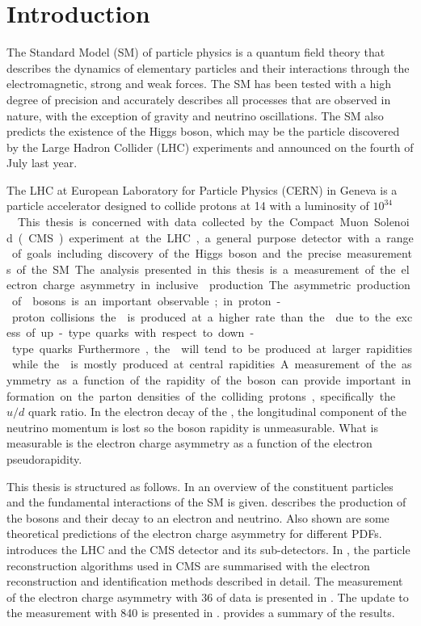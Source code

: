 \chapter{Introduction}
\label{chap:introduction}

The Standard Model (SM) of particle physics is a quantum field theory that
describes the dynamics of elementary particles and their interactions through
the electromagnetic, strong and weak forces. The {SM} has been tested with a
high degree of precision and accurately describes all processes that are observed
in nature, with the exception of gravity and neutrino oscillations. The {SM}
also predicts the existence of the Higgs boson, which may be the particle
discovered by the Large Hadron Collider (LHC) experiments and announced on the
fourth of July last year\cite{chatrchyan2012observation,aad2012observation}.

The LHC at European Laboratory for Particle Physics
(CERN) in Geneva is a particle accelerator designed to collide protons at
\unit{14}{\TeV} with a luminosity of \unit{$10^{34}$}{\lumiunits}. This thesis
is concerned with data collected by the Compact Muon Solenoid (CMS) experiment at
the {LHC}, a general purpose detector with a range of goals including discovery
of the Higgs boson and the precise measurements of the {SM}.

The analysis presented in this thesis is a measurement of the electron charge
asymmetry in inclusive \PW production. The asymmetric production of \PW bosons
is an important observable; in proton-proton collisions the \PWp is  produced at
a higher rate than the \PWm due to the excess of up-type quarks with respect to
down-type quarks. Furthermore, the \PWp will tend to be produced at larger
rapidities while the \PWm is mostly produced at central rapidities. A
measurement of the asymmetry as a function of the rapidity of the boson can
provide important information on the parton densities of the colliding protons,
specifically the ${u}/{d}$ quark ratio.  In the electron decay of the
\PW, the longitudinal component of the neutrino momentum is lost so the boson
rapidity is unmeasurable. What is measurable is the electron charge asymmetry as
a function of the electron pseudorapidity. 

This thesis is structured as follows. In  an overview of the
constituent particles  and the fundamental interactions of the {SM} is given.
 describes the production of the \PW bosons and their
decay to an electron and neutrino. Also shown are some theoretical predictions
of the electron charge asymmetry for different PDFs.  
introduces the {LHC} and the {CMS} detector and its sub-detectors.  In
, the particle reconstruction algorithms used in CMS
are summarised with the electron reconstruction and identification methods
described in detail. The measurement of the electron charge asymmetry with
\unit{36}{\invpb} of data is presented in . The update
to the measurement with \unit{840}{\invpb} is presented in
.  provides a summary of
the results.




